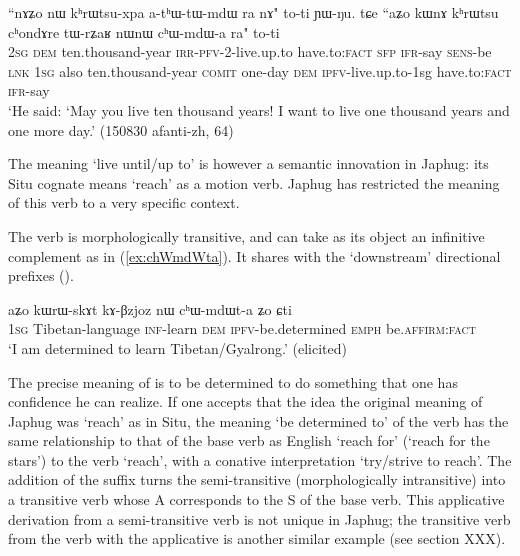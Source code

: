  \begin{exe}
\ex \label{ex:chWmdWa}
\gll ``nɤʑo nɯ kʰrɯtsu-xpa a-tʰɯ-tɯ-mdɯ ra nɤ" to-ti ɲɯ-ŋu. tɕe ``aʑo kɯnɤ kʰrɯtsu cʰondɤre tɯ-rʑaʁ nɯnɯ cʰɯ-mdɯ-a ra" to-ti \\
\textsc{2sg} \textsc{dem} ten.thousand-year \textsc{irr}-\textsc{pfv}-2-live.up.to have.to:\textsc{fact} \textsc{sfp} \textsc{ifr}-say \textsc{sens}-be \textsc{lnk} \textsc{1sg} also  ten.thousand-year \textsc{comit} one-day \textsc{dem} \textsc{ipfv}-live.up.to-1sg have.to:\textsc{fact} \textsc{ifr}-say \\
\glt `He said: `May you live ten thousand years! I want to live one thousand years and one more day.' (150830 afanti-zh, 64)
\end{exe}

The meaning `live until/up to' is however a semantic innovation in Japhug: its Situ cognate  means `reach' as a motion verb. Japhug has restricted the meaning of this verb to a very specific context.

The verb  is morphologically transitive, and can take as its object an infinitive complement as in (\ref{ex:chWmdWta}). It shares with  the `downstream' directional prefixes ().

 \begin{exe}
\ex \label{ex:chWmdWta}
\gll aʑo kɯrɯ-skɤt kɤ-βzjoz nɯ cʰɯ-mdɯt-a ʑo ɕti \\
\textsc{1sg} Tibetan-language \textsc{inf}-learn \textsc{dem} \textsc{ipfv}-be.determined \textsc{emph} be.\textsc{affirm}:\textsc{fact} \\
\glt `I am determined to learn Tibetan/Gyalrong.' (elicited)
\end{exe}

The precise meaning of   is to be determined to do something that one has confidence he can realize. If one accepts that the idea the original meaning of Japhug  was `reach' as in Situ, the meaning `be determined to' of the verb  has the same relationship to that of the base verb as English `reach for' (`reach for the stars') to the verb `reach', with a conative interpretation `try/strive to reach'.  The addition of the suffix  turns the semi-transitive (morphologically intransitive)  into a transitive verb whose A corresponds to the S of the base verb. This applicative derivation from a semi-transitive verb is not unique in Japhug; the transitive verb  from the verb  with the  applicative is another similar example (see section XXX).


